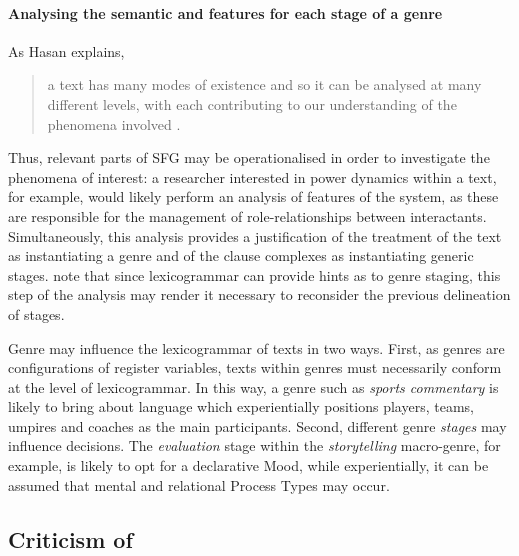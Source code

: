 \paragraph{Analysing the semantic and  features for each stage of a genre}

As Hasan explains,

\begin{quote}\singlespacing\small
a text has many modes of existence and so it can be analysed at many different levels, with each contributing to our understanding of the phenomena involved \parencite*[p.~116]{halliday_language_1989}.
\end{quote}
%
\noindent Thus, relevant parts of \gls{SFG} may be operationalised in order to investigate the phenomena of interest: a researcher interested in power dynamics within a text, for example, would likely perform an analysis of features of the  system, as these are responsible for the management of role\hyp{}relationships between interactants. Simultaneously, this analysis provides a justification of the treatment of the text as instantiating a genre and of the clause complexes as instantiating generic stages. \textcite{eggins_analysing_2004} note that since \gls{lexicogrammar} can provide hints as to genre staging, this step of the analysis may render it necessary to reconsider the previous delineation of stages.

Genre may influence the \gls{lexicogrammar} of texts in two ways. First, as genres are configurations of register variables, texts within genres must necessarily conform at the level of lexicogrammar. In this way, a genre such as \emph{sports commentary} is likely to bring about language which experientially positions players, teams, umpires and coaches as the main participants. Second, different genre \emph{stages} may influence  decisions. The \emph{evaluation} stage within the \emph{storytelling} macro\hyp{}genre, for example, is likely to opt for a declarative Mood, while experientially, it can be assumed that mental and relational Process Types may occur.

\subsection{Criticism of }

